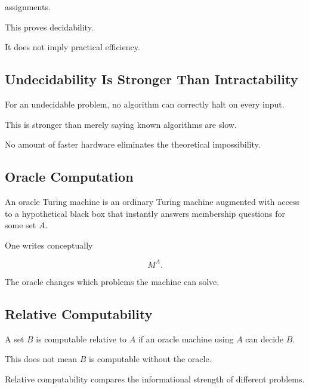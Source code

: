 assignments.

This proves decidability.

It does not imply practical efficiency.

\subsection{Undecidability Is Stronger Than Intractability}
\label{subsec:undecidability-vs-intractability}

For an undecidable problem, no algorithm can correctly halt on every input.

This is stronger than merely saying known algorithms are slow.

No amount of faster hardware eliminates the theoretical impossibility.

\subsection{Oracle Computation}
\label{subsec:oracle-computation}

An oracle Turing machine is an ordinary Turing machine augmented with
access to a hypothetical black box that instantly answers membership
questions for some set \(A\).

One writes conceptually

\[
\boxed{
M^A.
}
\]

The oracle changes which problems the machine can solve.

\subsection{Relative Computability}
\label{subsec:relative-computability}

A set \(B\) is computable relative to \(A\) if an oracle machine using \(A\)
can decide \(B\).

This does not mean \(B\) is computable without the oracle.

Relative computability compares the informational strength of different
problems.

